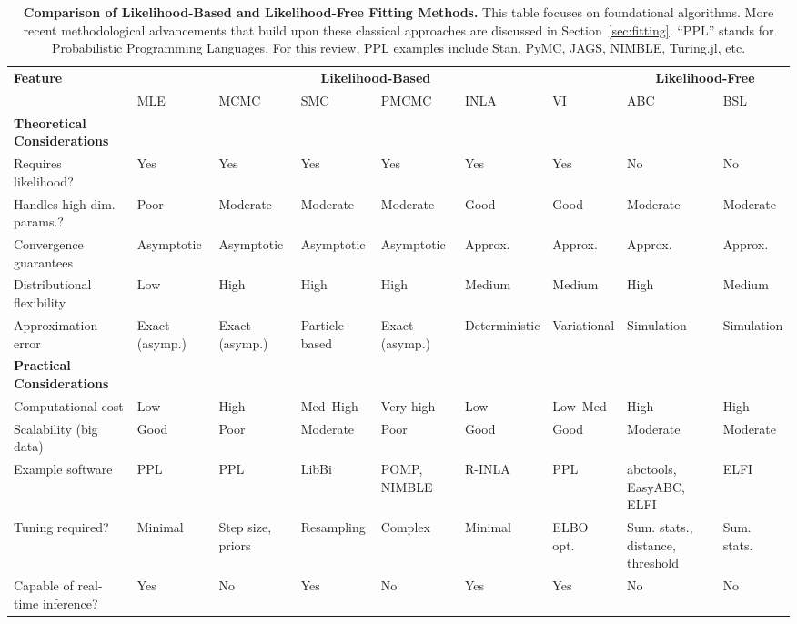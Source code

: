 \documentclass{article}
\begin{document}
\begin{landscape}
\begin{table}[ht]
\renewcommand{\arraystretch}{1.2}
\centering
\caption{\textbf{Comparison of Likelihood-Based and Likelihood-Free Fitting Methods.} 
This table focuses on foundational algorithms. More recent methodological advancements that build upon these classical approaches are discussed in Section~\ref{sec:fitting}. ``PPL'' stands for Probabilistic Programming Languages. For this review, PPL examples include Stan, PyMC, JAGS, NIMBLE, Turing.jl, etc.}
\label{tab:methods_comparison}
\small
\begin{tabular}{@{}p{3.5cm}p{1.5cm}p{1.5cm}p{1.5cm}p{1.5cm}p{1.5cm}p{1.5cm}p{1.5cm}p{1.5cm}@{}}
\toprule
\multirow{2}{*}{\textbf{Feature}} & \multicolumn{6}{c}{\textbf{Likelihood-Based}} & \multicolumn{2}{c}{\textbf{Likelihood-Free}} \\
\cmidrule(lr){2-7} \cmidrule(lr){8-9}
 & MLE & MCMC & SMC & PMCMC & INLA & VI & ABC & BSL \\
\midrule
\textbf{Theoretical Considerations} & & & & & & & & \\
\midrule
Requires likelihood? & Yes & Yes & Yes & Yes & Yes & Yes & No & No \\
Handles high-dim. params.? & Poor & Moderate & Moderate & Moderate & Good & Good & Moderate & Moderate \\
Convergence guarantees & Asymptotic & Asymptotic & Asymptotic & Asymptotic & Approx. & Approx. & Approx. & Approx. \\
Distributional flexibility & Low & High & High & High & Medium & Medium & High & Medium \\
Approximation error & Exact (asymp.) & Exact (asymp.) & Particle-based & Exact (asymp.) & Deterministic & Variational & Simulation & Simulation \\
\midrule
\textbf{Practical Considerations} & & & & & & & & \\
\midrule
Computational cost & Low & High & Med--High & Very high & Low & Low--Med & High & High \\
Scalability (big data) & Good & Poor & Moderate & Poor & Good & Good & Moderate & Moderate \\
Example software & PPL & PPL & LibBi & POMP, NIMBLE & R-INLA & PPL & abctools, EasyABC, ELFI & ELFI \\
Tuning required? & Minimal & Step size, priors & Resampling & Complex & Minimal & ELBO opt. & Sum. stats., distance, threshold & Sum. stats. \\
Capable of real-time inference? & Yes & No & Yes & No & Yes & Yes & No & No \\

\end{tabular}
\end{table}
\end{landscape}
\end{document}
